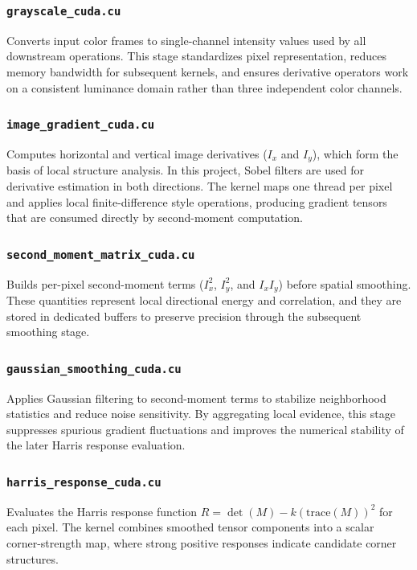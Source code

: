 \documentclass[conference]{IEEEtran}
\begin{document}
\subsubsection{\texttt{grayscale\_cuda.cu}}
Converts input color frames to single-channel intensity values used by all downstream operations. This stage standardizes pixel representation, reduces memory bandwidth for subsequent kernels, and ensures derivative operators work on a consistent luminance domain rather than three independent color channels.

\subsubsection{\texttt{image\_gradient\_cuda.cu}}
Computes horizontal and vertical image derivatives ($I_x$ and $I_y$), which form the basis of local structure analysis. In this project, Sobel filters are used for derivative estimation in both directions. The kernel maps one thread per pixel and applies local finite-difference style operations, producing gradient tensors that are consumed directly by second-moment computation.

\subsubsection{\texttt{second\_moment\_matrix\_cuda.cu}}
Builds per-pixel second-moment terms ($I_x^2$, $I_y^2$, and $I_x I_y$) before spatial smoothing. These quantities represent local directional energy and correlation, and they are stored in dedicated buffers to preserve precision through the subsequent smoothing stage.

\subsubsection{\texttt{gaussian\_smoothing\_cuda.cu}}
Applies Gaussian filtering to second-moment terms to stabilize neighborhood statistics and reduce noise sensitivity. By aggregating local evidence, this stage suppresses spurious gradient fluctuations and improves the numerical stability of the later Harris response evaluation.

\subsubsection{\texttt{harris\_response\_cuda.cu}}
Evaluates the Harris response function $R=\det(M)-k(\mathrm{trace}(M))^2$ for each pixel. The kernel combines smoothed tensor components into a scalar corner-strength map, where strong positive responses indicate candidate corner structures.
\end{document}
